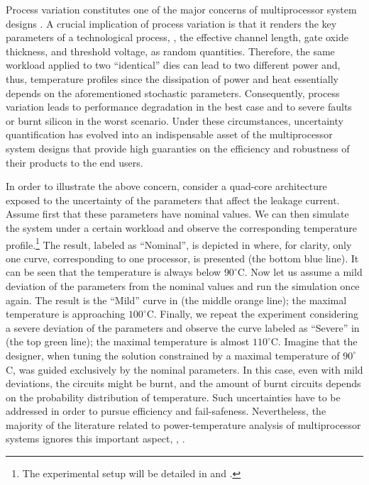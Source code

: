 Process variation constitutes one of the major concerns of multiprocessor system designs \cite{chandrakasan2001, srivastava2010}.
A crucial implication of process variation is that it renders the key parameters of a technological process, \eg, the effective channel length, gate oxide thickness, and threshold voltage, as random quantities.
Therefore, the same workload applied to two ``identical'' dies can lead to two different power and, thus, temperature profiles since the dissipation of power and heat essentially depends on the aforementioned stochastic parameters.
Consequently, process variation leads to performance degradation in the best case and to severe faults or burnt silicon in the worst scenario.
Under these circumstances, uncertainty quantification \cite{xiu2010, maitre2010} has evolved into an indispensable asset of the multiprocessor system designs that provide high guaranties on the efficiency and robustness of their products to the end users.


In order to illustrate the above concern, consider a quad-core architecture exposed to the uncertainty of the parameters that affect the leakage current.
Assume first that these parameters have nominal values.
We can then simulate the system under a certain workload and observe the corresponding temperature profile.\footnote{The experimental setup will be detailed in  and .}
The result, labeled as ``Nominal'', is depicted in  where, for clarity, only one curve, corresponding to one processor, is presented (the bottom blue line). It can be seen that the temperature is always below $90^{\circ}$C.
Now let us assume a mild deviation of the parameters from the nominal values and run the simulation once again. The result is the ``Mild'' curve in  (the middle orange line); the maximal temperature is approaching $100^{\circ}$C.
Finally, we repeat the experiment considering a severe deviation of the parameters and observe the curve labeled as ``Severe'' in  (the top green line); the maximal temperature is almost $110^{\circ}$C.
Imagine that the designer, when tuning the solution constrained by a maximal temperature of $90^\circ$C, was guided exclusively by the nominal parameters.
In this case, even with mild deviations, the circuits might be burnt, and the amount of burnt circuits depends on the probability distribution of temperature.
Such uncertainties have to be addressed in order to pursue efficiency and fail-safeness.
Nevertheless, the majority of the literature related to power-temperature analysis of multiprocessor systems ignores this important aspect, \eg, \cite{rao2009, rai2011, thiele2011, ukhov2012}.

